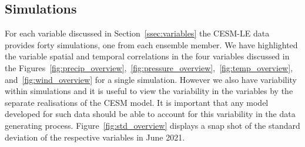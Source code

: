 
\subsection{Simulations}
For each variable discussed in Section~\ref{ssec:variables} the CESM-LE data provides forty simulations, one from each ensemble member.
We have highlighted the variable spatial and temporal correlations in the four variables discussed in the Figures~\ref{fig:precip_overview},~\ref{fig:pressure_overview},~\ref{fig:temp_overview}, and~\ref{fig:wind_overview} for a single simulation.
However we also have variability within simulations and it is useful to view the variability in the variables by the separate realisations of the CESM model.
It is important that any model developed for such data should be able to account for this variability in the data generating process.
Figure~\ref{fig:std_overview} displays a snap shot of the standard deviation of the respective variables in June 2021.

